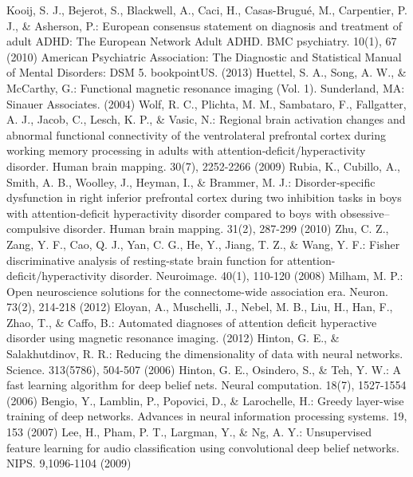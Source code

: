 \documentclass{llncs}
\begin{document}
%
%
\begin{thebibliography}{}
%
Kooij, S. J., Bejerot, S., Blackwell, A., Caci, H., Casas-Brugué, M., Carpentier, P. J., \& Asherson, P.: European consensus statement on diagnosis and treatment of adult ADHD: The European Network Adult ADHD. BMC psychiatry. 10(1), 67 (2010)
American Psychiatric Association: The Diagnostic and Statistical Manual of Mental Disorders: DSM 5. bookpointUS. (2013)
Huettel, S. A., Song, A. W., \& McCarthy, G.: Functional magnetic resonance imaging (Vol. 1). Sunderland, MA: Sinauer Associates. (2004)
Wolf, R. C., Plichta, M. M., Sambataro, F., Fallgatter, A. J., Jacob, C., Lesch, K. P., \& Vasic, N.: Regional brain activation changes and abnormal functional connectivity of the ventrolateral prefrontal cortex during working memory processing in adults with attention‐deficit/hyperactivity disorder. Human brain mapping. 30(7), 2252-2266 (2009)
Rubia, K., Cubillo, A., Smith, A. B., Woolley, J., Heyman, I., \& Brammer, M. J.: Disorder‐specific dysfunction in right inferior prefrontal cortex during two inhibition tasks in boys with attention‐deficit hyperactivity disorder compared to boys with obsessive–compulsive disorder. Human brain mapping. 31(2), 287-299 (2010) 
Zhu, C. Z., Zang, Y. F., Cao, Q. J., Yan, C. G., He, Y., Jiang, T. Z., \& Wang, Y. F.: Fisher discriminative analysis of resting-state brain function for attention-deficit/hyperactivity disorder. Neuroimage. 40(1), 110-120 (2008)
Milham, M. P.: Open neuroscience solutions for the connectome-wide association era. Neuron. 73(2), 214-218 (2012) 
Eloyan, A., Muschelli, J., Nebel, M. B., Liu, H., Han, F., Zhao, T., \& Caffo, B.: Automated diagnoses of attention deficit hyperactive disorder using magnetic resonance imaging. (2012)
Hinton, G. E., \& Salakhutdinov, R. R.: Reducing the dimensionality of data with neural networks. Science. 313(5786), 504-507 (2006)
Hinton, G. E., Osindero, S., \& Teh, Y. W.: A fast learning algorithm for deep belief nets. Neural computation. 18(7), 1527-1554 (2006)
Bengio, Y., Lamblin, P., Popovici, D., \& Larochelle, H.: Greedy layer-wise training of deep networks. Advances in neural information processing systems. 19, 153 (2007)
Lee, H., Pham, P. T., Largman, Y., \& Ng, A. Y.: Unsupervised feature learning for audio classification using convolutional deep belief networks. NIPS. 9,1096-1104 (2009)


\end{thebibliography}
\end{document}
